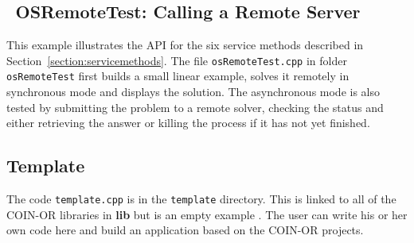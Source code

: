 \documentclass[11pt]{article}
\renewcommand{\_}{{\char"5F}}
\renewcommand{\{}{{\char"7B}}
\renewcommand{\}}{{\char"7D}}
\renewcommand{\^}{{\char"0D}}
\renewcommand{\'}{{\char"0D}}
\begin{document}
\subsection{ \, OSRemoteTest:  Calling a Remote Server}\label{section:exampleOSRemoteTest}

This example illustrates the API for the six service methods described in Section~\ref{section:servicemethods}.
The file {\tt osRemoteTest.cpp} in folder {\tt osRemoteTest} first builds a small linear
example, solves it remotely in synchronous mode and displays the solution.
The asynchronous mode is also tested by submitting the problem to a remote solver,
checking the status and either retrieving the answer or killing the process if it has not
yet finished.

\subsection{Template}\label{section:exampleTemplate} The code {\tt template.cpp} is in the {\tt template} directory.  This is linked to all of the COIN-OR libraries in {\bf lib} but is an empty example .  The user can write his or her own code here and build an application based on the COIN-OR projects. 
\end{document}
